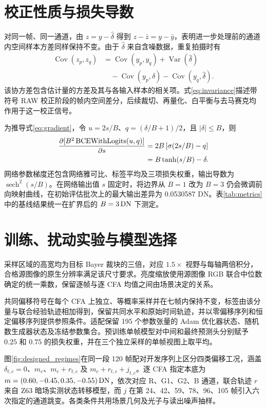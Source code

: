 \section{校正性质与损失导数}
\label{app:math}
对同一帧、同一通道，由 $z=y-\hat\delta$ 得到 $z-\bar z=y-\bar y$，表明进一步处理前的通道内空间样本方差同样保持不变。由于 $\hat\delta$ 来自含噪数据，重复拍摄时有
\begin{align}
 \operatorname{Cov}(z_p,z_q)
 &=\operatorname{Cov}(y_p,y_q)+\operatorname{Var}(\hat\delta)\nonumber\\
 &\quad-\operatorname{Cov}(y_p,\hat\delta)
       -\operatorname{Cov}(y_q,\hat\delta).
\end{align}
该协方差包含估计量的方差及其与各输入样本的相关项。式\eqref{eq:invariance}描述带符号 RAW 校正阶段的帧内空间差分，后续裁切、再量化、白平衡与去马赛克均作用于这一校正信号。

为推导式\eqref{eq:gradient}，令 $u=2s/B$、$q=(\delta/B+1)/2$，且 $|\delta|\le B$，则
\begin{align}
 \frac{\partial[B^2\operatorname{BCEWithLogits}(u,q)]}{\partial s}
 &=2B\left[\sigma(2s/B)-q\right]\nonumber\\
 &=B\tanh(s/B)-\delta.
\end{align}
网络参数梯度还包含网络雅可比、标签平均及三项损失权重，输出导数为 $\operatorname{sech}^2(s/B)$。在网络输出值 $s$ 固定时，将边界从 $B=1$ 改为 $B=3$ 仍会微调前向映射曲线，在初始评估批次上的最大输出差异为 0.0530587 DN。表\ref{tab:metrics}中的基线结果统一在扩界后的 $B=3\,\mathrm{DN}$ 下测定。

\section{训练、扰动实验与模型选择}
\label{app:protocol}
采样区域的高宽均为目标 Bayer 裁块的三倍，对应 $1.5\times$ 视野与每轴两倍积分，合格源图像的原生分辨率满足该尺寸要求。亮度缩放使用源图像 RGB 联合中位数确定的统一乘数，保留逐帧与逐 CFA 均值之间由场景决定的关系。

共同偏移符号在每个 CFA 上独立、等概率采样并在七帧内保持不变，标签由该分量与联合经验轨迹相加得到，保留共同水平和原始时间轨迹，并以零偏移序列和恒定偏移序列提供参照条件。适配保留 195 个参数张量的 Adam 优化器状态、随机数生成器状态及冻结参数集合。预训练单帧模型对中间和最终预测头分别赋予 $0.25$ 和 $0.75$ 的损失权重，并在三个独立采样的单帧视图上取平均。

图\ref{fig:designed_regimes}在同一段 120 帧配对开发序列上区分四类偏移工况，涵盖 $\delta_{t,c}=0$、$m_c$、$m_c+r_{t,c}$ 及 $m_c+r_{t,c}+j_{t,c}$。逐 CFA 指定本底为 $m=(0.60,-0.45,0.35,-0.55)\,\mathrm{DN}$，依次对应 R、G1、G2、B 通道，联合轨迹 $r$ 来自 Z63 暗场实测状态转移模型，而 $j$ 在第 24、42、59、78、96、105 帧引入六次指定的通道跳变。各类条件共用场景几何及光子与读出噪声抽样。

